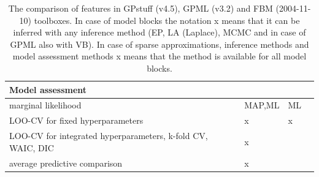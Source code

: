 \documentclass[twoside,11pt]{article}
\begin{document}
\begin{table}
\begin{tabular}{p{9.5cm}p{2.3cm}p{2.1cm}p{0.9cm}}
    \multicolumn{4}{l}{\textbf{Model assessment}} \\
    \hline
    marginal likelihood & MAP,ML & ML & \\
    LOO-CV for fixed hyperparameters & x & x & \\
    LOO-CV for integrated hyperparameters, k-fold CV, WAIC, DIC & x &  &  \\
    average predictive comparison & x &  & 
  \end{tabular}
  \normalsize
  \caption{The comparison of features in GPstuff (v4.5), GPML (v3.2) and FBM (2004-11-10)
    toolboxes. In case of model blocks the notation x means that it
    can be inferred with any inference method (EP, LA (Laplace), MCMC and
    in case of GPML also with VB). In case of sparse approximations,
    inference methods and model assessment methods x means
    that the method is available for all model blocks.\label{table:comparison}}
\end{table}
\end{document}

